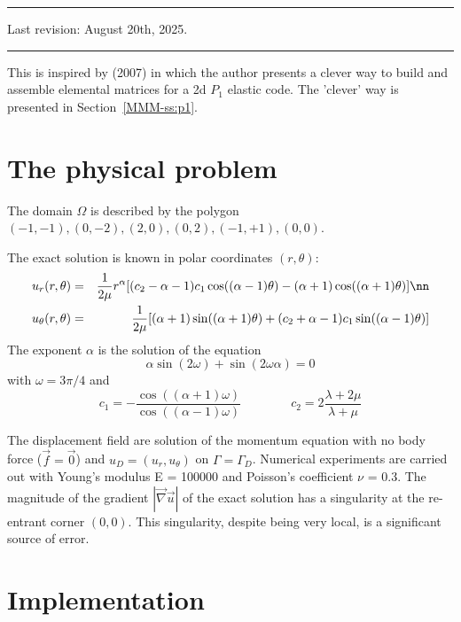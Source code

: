\par\noindent\rule{\textwidth}{0.4pt}

Last revision: August 20th, 2025.

\par\noindent\rule{\textwidth}{0.4pt}


This \stone is inspired by \textcite{koko07} (2007) in which the author presents 
a clever way to build and assemble elemental matrices for a 2d $P_1$ elastic code.
The 'clever' way is presented in Section~\ref{MMM-ss:p1}.

\section*{The physical problem}

The domain $\Omega$ is described by the polygon
$(-1,-1), (0,-2), (2, 0), (0, 2), (-1,+1), (0, 0)$.

The exact solution is known in polar coordinates $(r,\theta)$:
\begin{eqnarray}
u_r(r,\theta)
&=&\frac{1}{2\mu} r^\alpha 
[(c_2 - \alpha - 1)c_1 \cos((\alpha - 1)\theta) 
- (\alpha + 1) \cos((\alpha + 1)\theta)] \nn\\
u_\theta(r,\theta)&=& 
\frac{1}{2\mu}
[(\alpha + 1) \sin((\alpha + 1)\theta) 
+ (c_2 + \alpha - 1)c_1 \sin((\alpha - 1)\theta)]
\end{eqnarray}
The exponent $\alpha$ is the solution of the equation
\[
\alpha \sin(2\omega) + \sin(2\omega \alpha ) = 0
\]
with $\omega=3\pi/4$ and
\[
c_1 = -\frac{\cos((\alpha+1)\omega)}{\cos((\alpha-1)\omega)}
\qquad
\qquad
c_2 = 2 \frac{\lambda + 2\mu}{\lambda+\mu}
\]

The displacement field are solution of the momentum equation 
with no body force ($\vec{f} = \vec{0}$) and $u_D = (u_r , u_\theta )$ on 
$\Gamma = \Gamma_D$. Numerical
experiments are carried out with Young’s modulus E = 100000 and Poisson’s coefficient $\nu$ = 0.3. The magnitude of
the gradient $|\vec\nabla \vec{u}|$ of the exact solution 
has a singularity at the re-entrant corner $(0,0)$. This singularity,
despite being very local, is a significant source of error.

\section*{Implementation}

